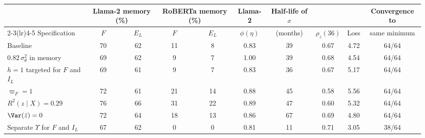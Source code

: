 \begin{tabular}{lccccccccc}
\toprule
 & \multicolumn{2}{c}{Llama-2 memory (\%)} & \multicolumn{2}{c}{RoBERTa memory (\%)} & Llama-2 & Half-life of $x$ & & & Convergence to \\
\cmidrule(lr){2-3}\cmidrule(lr){4-5}
Specification & $F$ & $E_L$ & $F$ & $E_L$ & $\phi(\eta)$ & (months) & $\rho_z(36)$ & Loss & same minimum \\
\midrule
Baseline & 70 & 62 & 11 & 8 & 0.83 & 39 & 0.67 & 4.72 & 64/64 \\
$0.82\,\sigma_\theta^2$ in memory & 69 & 62 & 9 & 7 & 1.00 & 39 & 0.68 & 4.54 & 64/64 \\
$h=1$ targeted for $F$ and $I_L$ & 69 & 61 & 9 & 7 & 0.83 & 36 & 0.67 & 5.17 & 64/64 \\
$\varpi_F=1$ & 72 & 61 & 21 & 14 & 0.88 & 45 & 0.58 & 5.56 & 64/64 \\
$R^2(z\mid X)=0.29$ & 76 & 66 & 31 & 22 & 0.89 & 47 & 0.60 & 5.32 & 64/64 \\
$\Var(\bar z)=0$ & 72 & 64 & 18 & 13 & 0.86 & 67 & 0.69 & 4.80 & 64/64 \\
Separate $\Upsilon$ for $F$ and $I_L$ & 67 & 62 & 0 & 0 & 0.81 & 11 & 0.71 & 3.05 & 38/64 \\
\bottomrule
\end{tabular}
